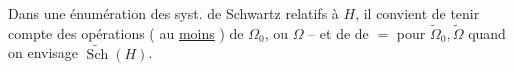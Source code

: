  Dans une énumération des syst. de Schwartz relatifs à $H$, il convient de tenir compte des opérations ( au \uline{moins} ) de $\Omega_0$, ou $\Omega$ -- et de de $=$ pour $\widetilde\Omega_0,\widetilde\Omega$ quand on envisage $\widetilde{\operatorname{Sch}}(H)$.

